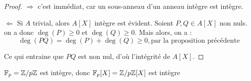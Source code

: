 \begin{proof}
	$\Rightarrow$ c'est immédiat, car un sous-anneau d'un anneau intègre est intègre.

	$\Leftarrow$ Si $A$ trivial, alors $A[X]$ intègre est évident.
	Soient $P, Q \in A[X]$ non nuls. on a donc $\deg(P) \geqslant 0$ et $\deg(Q) \geqslant 0$.
	Mais alors, on a :
	$$
		\deg(P Q)=\deg(P)+\deg(Q) \geqslant 0, \text{par la proposition précédente}
	$$

	Ce qui entraine que $P Q$ est non nul, d'où l'intégrité de $A[X]$.
\end{proof}

\begin{example}
	$\mathbb{F}_p=\mathbb{Z}/p\mathbb{Z}$ est intègre, donc $\mathbb{F}_p[X] = \mathbb{Z}/p\mathbb{Z}[X]$ est intègre
\end{example}
